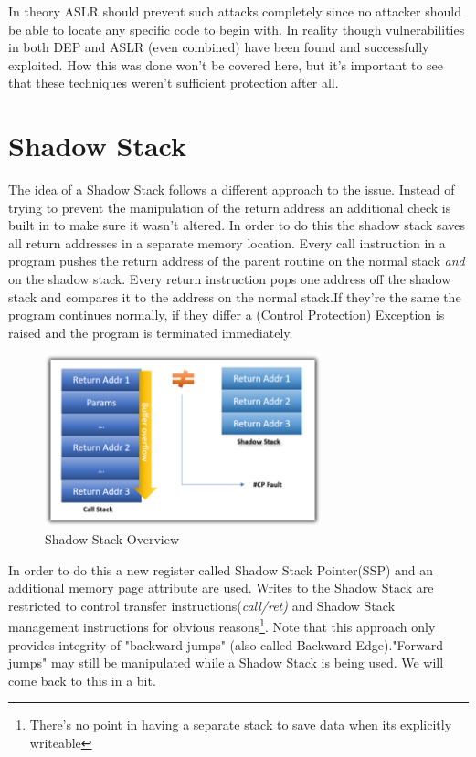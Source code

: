 \documentclass[10pt,twocolumn,a4paper]{article}
\begin{document}
\newline
In theory ASLR should prevent such attacks completely since no attacker should be able to locate any specific code to begin with.
In reality though vulnerabilities in both DEP and ASLR (even combined) have been found and successfully exploited.
How this was done won't be covered here, but it's important to see that these techniques weren't sufficient protection after all.

\section{Shadow Stack}\label{shadowstack}
The idea of a Shadow Stack follows a different approach to the issue.
Instead of trying to prevent the manipulation of the return address an additional check is built in to make sure it wasn't altered.
In order to do this the shadow stack saves all return addresses in a separate memory location.
Every call instruction in a program pushes the return address of the parent routine on the normal stack \emph{and} on the shadow stack.
Every return instruction pops one address off the shadow stack and compares it to the address on the normal stack.If they're the same the program continues normally, if they differ a (Control Protection) Exception is raised and the program is terminated immediately.
\begin{figure}[htbp]
\includegraphics[keepaspectratio,width=8cm]{fig/Shadow Stack}
\caption{Shadow Stack Overview}
\end{figure}
\newline
In order to do this a new register called Shadow Stack Pointer(SSP) and an additional memory page attribute are used.
Writes to the Shadow Stack are restricted to control transfer instructions(\emph{call/ret)} and Shadow Stack management instructions for obvious reasons\footnote{There's no point in having a separate stack to save data when its explicitly writeable}.
Note that this approach only provides integrity of "backward jumps" (also called Backward Edge)."Forward jumps" may still be manipulated while a Shadow Stack is being used. We will come back to this in a bit.
\end{document}
